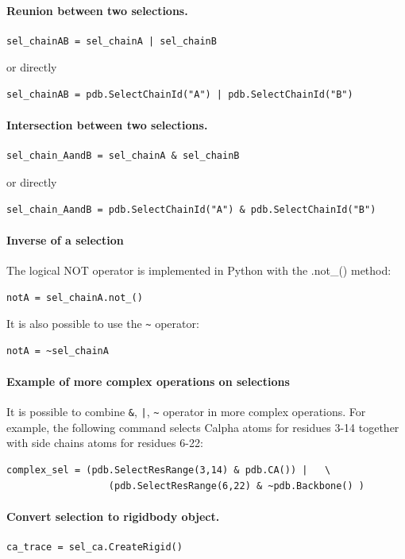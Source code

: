 \documentclass[12pt,a4paper]{article}
\begin{document}
\paragraph{Reunion between two selections.}
\begin{verbatim}
sel_chainAB = sel_chainA | sel_chainB
\end{verbatim}
or directly
\begin{verbatim}
sel_chainAB = pdb.SelectChainId("A") | pdb.SelectChainId("B")
\end{verbatim}

\paragraph{Intersection between two selections.}
\begin{verbatim}
sel_chain_AandB = sel_chainA & sel_chainB
\end{verbatim}
or directly
\begin{verbatim}
sel_chain_AandB = pdb.SelectChainId("A") & pdb.SelectChainId("B")
\end{verbatim}

\paragraph{Inverse of a selection}
The logical NOT operator is implemented in Python with the .not\_() method:
\begin{verbatim}
notA = sel_chainA.not_()
\end{verbatim}
It is also possible to use the \verb!~! operator:
\begin{verbatim}
notA = ~sel_chainA
\end{verbatim}    

\paragraph{Example of more complex operations on selections}
It is possible to combine \verb!&!, \verb!|!, \verb!~! operator in more complex operations. 
For example, the following command selects Calpha atoms for residues 3-14 together with side chains atoms
for residues 6-22:
\begin{verbatim}
complex_sel = (pdb.SelectResRange(3,14) & pdb.CA()) |   \
                  (pdb.SelectResRange(6,22) & ~pdb.Backbone() )
\end{verbatim}

\paragraph{Convert selection to rigidbody object.}
\begin{verbatim}
ca_trace = sel_ca.CreateRigid()
\end{verbatim}
\end{document}

